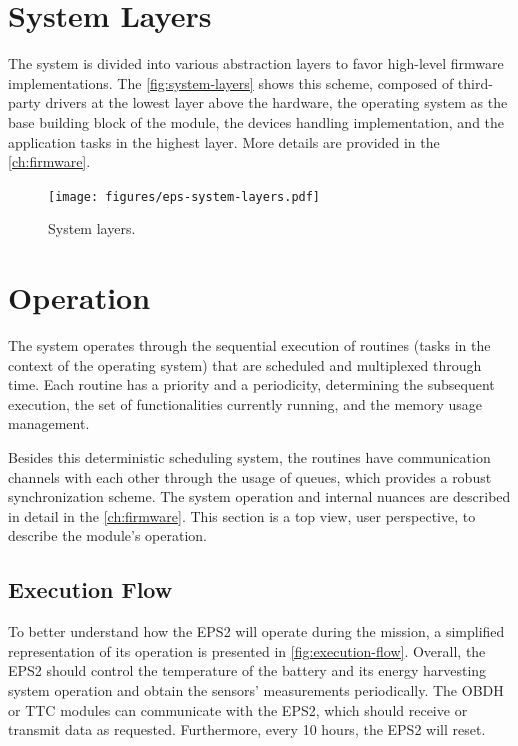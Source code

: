 \section{System Layers} \label{sec:system-layers}

The system is divided into various abstraction layers to favor high-level firmware implementations. The \autoref{fig:system-layers} shows this scheme, composed of third-party drivers at the lowest layer above the hardware, the operating system as the base building block of the module, the devices handling implementation, and the application tasks in the highest layer. More details are provided in the \autoref{ch:firmware}.

\begin{figure}[!ht]
    \begin{center}
        \texttt{[image: figures/eps-system-layers.pdf]}
        \caption{System layers.}
        \label{fig:system-layers}
    \end{center}
\end{figure}

\section{Operation} \label{sec:operation}

The system operates through the sequential execution of routines (tasks in the context of the operating system) that are scheduled and multiplexed through time. Each routine has a priority and a periodicity, determining the subsequent execution, the set of functionalities currently running, and the memory usage management.

Besides this deterministic scheduling system, the routines have communication channels with each other through the usage of queues, which provides a robust synchronization scheme. The system operation and internal nuances are described in detail in the \autoref{ch:firmware}. This section is a top view, user perspective, to describe the module's operation.

\subsection{Execution Flow}

To better understand how the EPS2 will operate during the mission, a simplified representation of its operation is presented in \autoref{fig:execution-flow}. Overall, the EPS2 should control the temperature of the battery and its energy harvesting system operation and obtain the sensors' measurements periodically. The OBDH or TTC modules can communicate with the EPS2, which should receive or transmit data as requested. Furthermore, every 10 hours, the EPS2 will reset.

